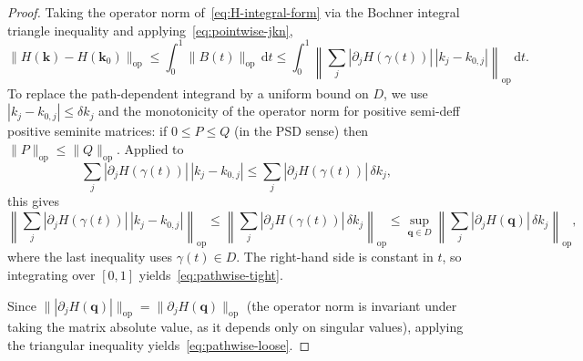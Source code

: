 \documentclass[11pt]{article}
\numberwithin{equation}{section}
\begin{document}
\begin{proof}
    Taking the operator norm of~\eqref{eq:H-integral-form} via the Bochner
    integral triangle inequality and applying~\eqref{eq:pointwise-jkn},
    \begin{equation}
        \|H(\mathbf{k}) - H(\mathbf{k}_0)\|_\mathrm{op}
        \leq \int_0^1 \|B(t)\|_\mathrm{op}\,\mathrm{d}t
        \leq \int_0^1 \left\| \sum_j |\partial_j H(\gamma(t))|\, |k_j - k_{0,j}|
        \right\|_\mathrm{op}\,\mathrm{d}t.
        \label{eq:integrated-jkn}
    \end{equation}
    To replace the path-dependent integrand by a uniform bound on \(D\), we use
    \(|k_j - k_{0,j}| \leq \delta k_j\) and the monotonicity of the operator
    norm for positive semi-deff positive seminite matrices: if \(0 \leq P
    \leq Q\) (in the PSD sense) then \(\|P\|_\mathrm{op}\leq\|Q\|_\mathrm{op}\).
    Applied to
    \begin{equation}
        \sum_j |\partial_j H(\gamma(t))|\, |k_j - k_{0,j}|
        \leq \sum_j |\partial_j H(\gamma(t))|\, \delta k_j,
    \end{equation}
    this gives
    \begin{equation}
        \left\| \sum_j |\partial_j H(\gamma(t))|\, |k_j - k_{0,j}|
        \right\|_\mathrm{op}
        \leq \left\| \sum_j |\partial_j H(\gamma(t))|\, \delta k_j
        \right\|_\mathrm{op}
        \leq \sup_{\mathbf{q} \in D}
        \left\| \sum_j |\partial_j H(\mathbf{q})|\, \delta k_j
        \right\|_\mathrm{op},
    \end{equation}
    where the last inequality uses \(\gamma(t) \in D\). The right-hand side is
    constant in \(t\), so integrating over \([0,1]\)
    yields~\eqref{eq:pathwise-tight}.

    Since \(\||\partial_j H(\mathbf{q})|\|_\mathrm{op} = \|\partial_j
    H(\mathbf{q})\|_\mathrm{op}\) (the operator norm is invariant under taking the matrix
    absolute value, as it depends only on singular values), applying the triangular
    inequality yields~\eqref{eq:pathwise-loose}.
\end{proof}
\end{document}
